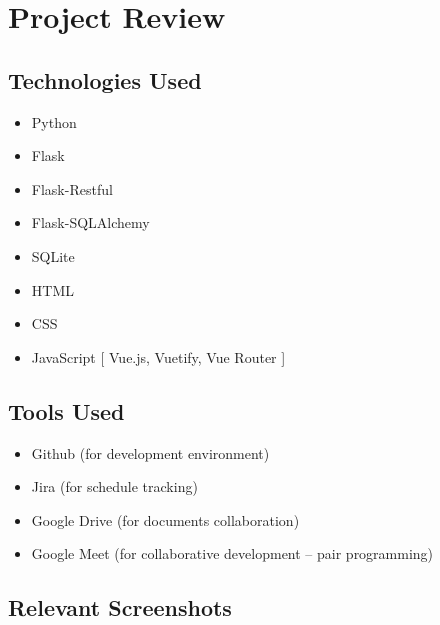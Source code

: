 \newpage

\section{Project Review}
\subsection{Technologies Used}
\begin{itemize}
    \tightlist
    \item Python
    \item Flask 
    \item Flask-Restful
    \item Flask-SQLAlchemy
    \item SQLite
    \item HTML
    \item CSS
    \item JavaScript [ Vue.js, Vuetify, Vue Router ]
\end{itemize}

\subsection{Tools Used}
\begin{itemize}
    \tightlist
    \item Github (for development environment)
    \item Jira (for schedule tracking)
    \item Google Drive (for documents collaboration)
    \item Google Meet (for collaborative development – pair programming) 
\end{itemize}

\subsection{Relevant Screenshots}

